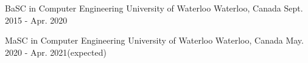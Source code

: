 


\begin{cventries}


\cventry
{BaSC in Computer Engineering} %
{University of Waterloo} %
{Waterloo, Canada} %
{Sept. 2015 - Apr. 2020} %
{ %
\begin{cvitems}
\end{cvitems}
}

\cventry
{MaSC in Computer Engineering} %
{University of Waterloo} %
{Waterloo, Canada} %
{May. 2020 - Apr. 2021(expected)} %
{ %
\begin{cvitems}
\end{cvitems}
}


\end{cventries}